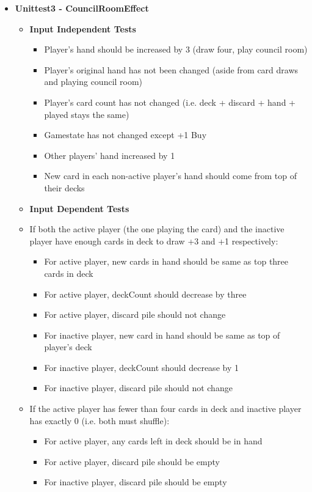 \documentclass[11pt,letterpaper]{article}
\begin{document}
\begin{enumerate}[label=\Roman*.]
\begin{itemize}[leftmargin=*]
      \item \textbf{Unittest3 - CouncilRoomEffect}

        \begin{itemize}[leftmargin=*, label={}]
          \item \textbf{Input Independent Tests}

            \begin{itemize}[leftmargin=*]
              \item Player's hand should be increased by 3 (draw four, play council room)
              \item Player's original hand has not been changed (aside from card draws and playing council room)
              \item Player's card count has not changed (i.e. deck + discard + hand + played stays the same)
              \item Gamestate has not changed except +1 Buy
              \item Other players' hand increased by 1
              \item New card in each non-active player's hand should come from top of their decks
            \end{itemize}

          \item \textbf{Input Dependent Tests}
          \item If both the active player (the one playing the card) and the inactive player have enough cards in deck to draw +3 and +1 respectively:
            \begin{itemize}[leftmargin=*]
              \item For active player, new cards in hand should be same as top three cards in deck
              \item For active player, deckCount should decrease by three
              \item For active player, discard pile should not change
              \item For inactive player, new card in hand should be same as top of player's deck
              \item For inactive player, deckCount should decrease by 1
              \item For inactive player, discard pile should not change
            \end{itemize}
          \item If the active player has fewer than four cards in deck and inactive player has exactly 0 (i.e. both must shuffle):
            \begin{itemize}[leftmargin=*]
              \item For active player, any cards left in deck should be in hand
              \item For active player, discard pile should be empty
              \item For inactive player, discard pile should be empty
            \end{itemize}
        \end{itemize}


\end{itemize}
\end{enumerate}
\end{document}
